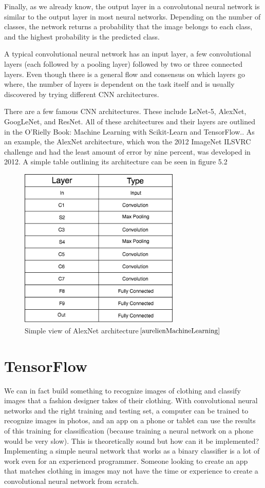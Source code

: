 \documentclass[12pt]{report} %
\begin{document}
	Finally, as we already know, the output layer in a convolutonal neural network is similar to the output layer in most neural networks. Depending on the number of classes, the network returns a probability that the image belongs to each class, and the highest probability is the predicted class. 
	
	A typical convolutional neural network has an input layer, a few convolutional layers (each followed by a pooling layer) followed by two or three connected layers. Even though there is a general flow and consensus on which layers go where, the number of layers is dependent on the task itself and is usually discovered by trying different CNN architectures.
	
	There are a few famous CNN architectures. These include LeNet-5, AlexNet, GoogLeNet, and ResNet. All of these architectures and their layers are outlined in the O'Rielly Book: Machine Learning with Scikit-Learn and TensorFlow.\cite{aurelienMachineLearning}. As an example, the AlexNet architecture, which won the 2012 ImageNet ILSVRC challenge and had the least amount of error by nine percent, was developed in 2012. A simple table outlining its architecture can be seen in figure 5.2
\begin{figure}
\centering
\includegraphics[width=3in]{alex_net_arch}
\caption{Simple view of AlexNet architecture$\cite{aurelienMachineLearning}$}
\end{figure}		

\chapter{TensorFlow}
	We can in fact build something to recognize images of clothing and classify images that a fashion designer takes of their clothing. With convolutional neural networks and the right training and testing set, a computer can be trained to recognize images in photos, and an app on a phone or tablet can use the results of this training for classification (because training a neural network on a phone would be very slow). This is theoretically sound but how can it be implemented? Implementing a simple neural network that works as a binary classifier is a lot of work even for an experienced programmer. Someone looking to create an app that matches clothing in images may not have the time or experience to create a convolutional neural network from scratch. 
\end{document}
